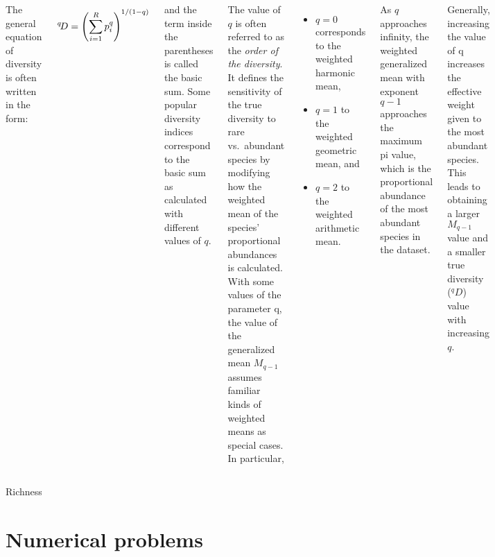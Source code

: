 \documentclass[
  ignorenonframetext,
  aspectratio=169]{beamer}
\newcommand{\bcolumns}{\begin{columns}[T, onlytextwidth]}
\newcommand{\ecolumns}{\end{columns}}
\begin{document}
\begin{frame}{}
\protect\hypertarget{section-4}{}
\bcolumns
{}
\small

The general equation of diversity is often written in the form:

\[
\small
{}^{q}\!D=\left({\sum _{i=1}^{R}p_{i}^{q}}\right)^{1/(1-q)}
\]

and the term inside the parentheses is called the basic sum. Some
popular diversity indices correspond to the basic sum as calculated with
different values of \(q\).

\tiny

The value of \(q\) is often referred to as the \emph{order of the
diversity}. It defines the sensitivity of the true diversity to rare
vs.~abundant species by modifying how the weighted mean of the species'
proportional abundances is calculated. With some values of the parameter
q, the value of the generalized mean \(M_{q-1}\) assumes familiar kinds
of weighted means as special cases. In particular,

\begin{itemize}
\tiny
\item $q = 0$ corresponds to the weighted harmonic mean,
\item $q = 1$ to the weighted geometric mean, and
\item $q = 2$ to the weighted arithmetic mean.
\end{itemize}

As \(q\) approaches infinity, the weighted generalized mean with
exponent \(q-1\) approaches the maximum pi value, which is the
proportional abundance of the most abundant species in the dataset.

Generally, increasing the value of q increases the effective weight
given to the most abundant species. This leads to obtaining a larger
\(M_{q-1}\) value and a smaller true diversity (\(^q D\)) value with
increasing \(q\).

\ecolumns
\end{frame}

\begin{frame}{Richness}
\protect\hypertarget{richness}{}
\end{frame}

\hypertarget{numerical-problems}{%
\section{Numerical problems}\label{numerical-problems}}
\end{document}
